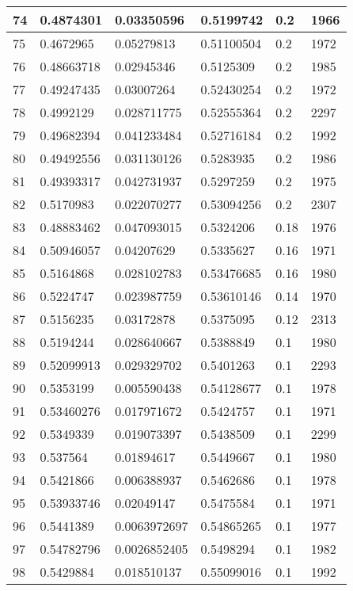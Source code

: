 \begin{longtable}{|l|l|l|l|l|l|}
74 & 0.4874301 & 0.03350596 & 0.5199742 & 0.2 & 1966 \\ \hline 
75 & 0.4672965 & 0.05279813 & 0.51100504 & 0.2 & 1972 \\ \hline 
76 & 0.48663718 & 0.02945346 & 0.5125309 & 0.2 & 1985 \\ \hline 
77 & 0.49247435 & 0.03007264 & 0.52430254 & 0.2 & 1972 \\ \hline 
78 & 0.4992129 & 0.028711775 & 0.52555364 & 0.2 & 2297 \\ \hline 
79 & 0.49682394 & 0.041233484 & 0.52716184 & 0.2 & 1992 \\ \hline 
80 & 0.49492556 & 0.031130126 & 0.5283935 & 0.2 & 1986 \\ \hline 
81 & 0.49393317 & 0.042731937 & 0.5297259 & 0.2 & 1975 \\ \hline 
82 & 0.5170983 & 0.022070277 & 0.53094256 & 0.2 & 2307 \\ \hline 
83 & 0.48883462 & 0.047093015 & 0.5324206 & 0.18 & 1976 \\ \hline 
84 & 0.50946057 & 0.04207629 & 0.5335627 & 0.16 & 1971 \\ \hline 
85 & 0.5164868 & 0.028102783 & 0.53476685 & 0.16 & 1980 \\ \hline 
86 & 0.5224747 & 0.023987759 & 0.53610146 & 0.14 & 1970 \\ \hline 
87 & 0.5156235 & 0.03172878 & 0.5375095 & 0.12 & 2313 \\ \hline 
88 & 0.5194244 & 0.028640667 & 0.5388849 & 0.1 & 1980 \\ \hline 
89 & 0.52099913 & 0.029329702 & 0.5401263 & 0.1 & 2293 \\ \hline 
90 & 0.5353199 & 0.005590438 & 0.54128677 & 0.1 & 1978 \\ \hline 
91 & 0.53460276 & 0.017971672 & 0.5424757 & 0.1 & 1971 \\ \hline 
92 & 0.5349339 & 0.019073397 & 0.5438509 & 0.1 & 2299 \\ \hline 
93 & 0.537564 & 0.01894617 & 0.5449667 & 0.1 & 1980 \\ \hline 
94 & 0.5421866 & 0.006388937 & 0.5462686 & 0.1 & 1978 \\ \hline 
95 & 0.53933746 & 0.02049147 & 0.5475584 & 0.1 & 1971 \\ \hline 
96 & 0.5441389 & 0.0063972697 & 0.54865265 & 0.1 & 1977 \\ \hline 
97 & 0.54782796 & 0.0026852405 & 0.5498294 & 0.1 & 1982 \\ \hline 
98 & 0.5429884 & 0.018510137 & 0.55099016 & 0.1 & 1992 \\ \hline 

\end{longtable}
